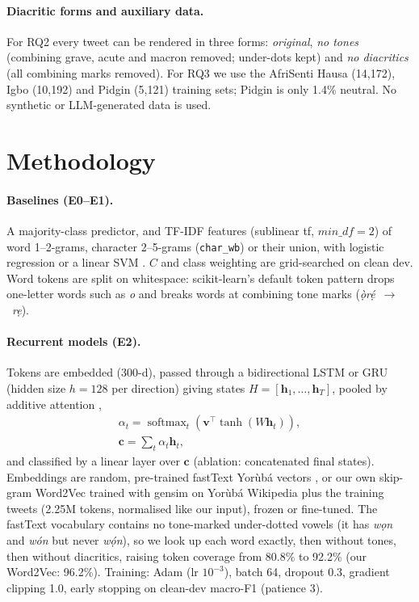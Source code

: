 \documentclass[11pt]{article}
\begin{document}
\paragraph{Diacritic forms and auxiliary data.} For RQ2 every tweet can be rendered in three forms: \emph{original}, \emph{no tones} (combining grave, acute and macron removed; under-dots kept) and \emph{no diacritics} (all combining marks removed). For RQ3 we use the AfriSenti Hausa (14,172), Igbo (10,192) and Pidgin (5,121) training sets; Pidgin is only 1.4\% neutral. No synthetic or LLM-generated data is used.

\section{Methodology}
\paragraph{Baselines (E0--E1).} A majority-class predictor, and TF-IDF features (sublinear tf, $\textit{min\_df}=2$) of word 1--2-grams, character 2--5-grams (\texttt{char\_wb}) or their union, with logistic regression or a linear SVM \citep{pedregosa-etal-2011-scikit}. $C$ and class weighting are grid-searched on clean dev. Word tokens are split on whitespace: scikit-learn's default token pattern drops one-letter words such as \emph{o} and breaks words at combining tone marks (\emph{ọ̀rẹ́}~$\rightarrow$~\emph{rẹ}).

\paragraph{Recurrent models (E2).} Tokens are embedded (300-d), passed through a bidirectional LSTM or GRU (hidden size $h=128$ per direction) giving states $H=[\mathbf{h}_1,\dots,\mathbf{h}_T]$, pooled by additive attention \citep{bahdanau-etal-2015-neural},
\begin{gather*}
\alpha_t = \operatorname{softmax}_t\!\left(\mathbf{v}^{\top}\tanh(W\mathbf{h}_t)\right),\\
\mathbf{c}=\textstyle\sum_t \alpha_t\mathbf{h}_t ,
\end{gather*}
and classified by a linear layer over $\mathbf{c}$ (ablation: concatenated final states). Embeddings are random, pre-trained fastText Yorùbá vectors \citep{grave-etal-2018-learning}, or our own skip-gram Word2Vec \citep{mikolov-etal-2013-efficient} trained with gensim \citep{rehurek-sojka-2010-gensim} on Yorùbá Wikipedia plus the training tweets (2.25M tokens, normalised like our input), frozen or fine-tuned. The fastText vocabulary contains no tone-marked under-dotted vowels (it has \emph{wọn} and \emph{wón} but never \emph{wọ́n}), so we look up each word exactly, then without tones, then without diacritics, raising token coverage from 80.8\% to 92.2\% (our Word2Vec: 96.2\%). Training: Adam (lr $10^{-3}$), batch 64, dropout 0.3, gradient clipping 1.0, early stopping on clean-dev macro-F1 (patience 3).
\end{document}
